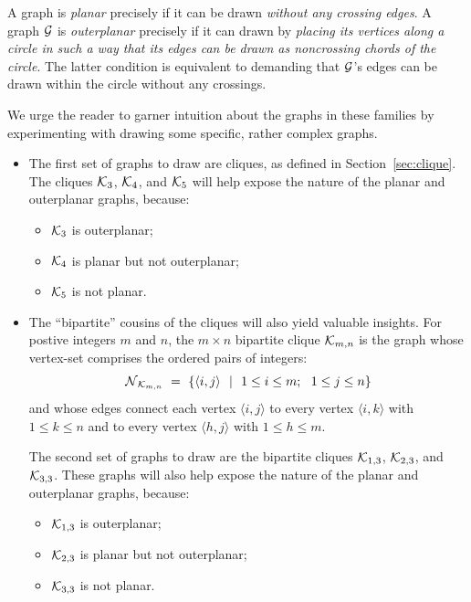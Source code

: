 \noindent
A graph is {\it planar}  
precisely if it can be drawn {\em without any crossing edges}.  A
graph $\mbox{$\cal G$}$ is {\it outerplanar} 
 precisely if it can drawn by {\em placing
  its vertices along a circle in such a way that its edges can be drawn
  as noncrossing chords of the circle}.  The latter condition is
equivalent to demanding that $\mbox{$\cal G$}$'s edges can be drawn within the
circle without any crossings.

We urge the reader to garner intuition about the graphs in these
families by experimenting with drawing some specific, rather complex
graphs.
\begin{itemize}
\item
The first set of graphs to draw are cliques, as defined in
Section~\ref{sec:clique}.  The cliques $\mbox{$\cal K$}_3$, $\mbox{$\cal K$}_4$, and
$\mbox{$\cal K$}_5$ will help expose the nature of the planar and outerplanar
graphs, because:
  \begin{itemize}
  \item
$\mbox{$\cal K$}_3$ is outerplanar; 
  \item
$\mbox{$\cal K$}_4$ is planar but not outerplanar;
  \item
$\mbox{$\cal K$}_5$ is not planar.
  \end{itemize}

\item
The ``bipartite'' cousins of the cliques will also yield valuable
insights.  For postive integers $m$ and $n$, the $m \times n$
bipartite clique $\mbox{$\cal K$}_{m,n}$  is the graph
whose vertex-set comprises the ordered pairs of integers:
\[  \mbox{$\cal N$}_{\mbox{{\scriptsize $\cal K$}}_{m,n}} \ = \
\{ \langle i,j \rangle \ \ | \ \ 1 \leq i \leq m; \ \ 1 \leq j \leq n\}
\]
and whose edges connect each vertex $\langle i,j \rangle$ to every vertex
$\langle i,k \rangle$ with $1 \leq k \leq n$ and to every vertex
$\langle h,j \rangle$ with $1 \leq h \leq m$.

The second set of graphs to draw are the bipartite cliques $\mbox{$\cal K$}_{1,3}$,
$\mbox{$\cal K$}_{2,3}$, and $\mbox{$\cal K$}_{3,3}$.  These graphs will also help expose the
nature of the planar and outerplanar graphs, because:
  \begin{itemize}
  \item
$\mbox{$\cal K$}_{1,3}$ is outerplanar; 
  \item
$\mbox{$\cal K$}_{2,3}$ is planar but not outerplanar;
  \item
$\mbox{$\cal K$}_{3,3}$ is not planar.
  \end{itemize}
\end{itemize}

